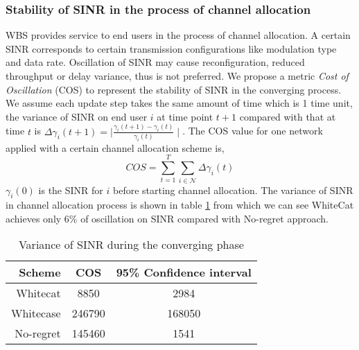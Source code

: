 \subsubsection*{Stability of SINR in the process of channel allocation}
WBS provides service to end users in the process of channel allocation. 
A certain SINR corresponds to certain transmission configurations like modulation type and data rate. Oscillation of SINR may cause reconfiguration, reduced throughput or delay variance, thus is not preferred. We propose a metric \textit{Cost of Oscillation} (COS) to represent the stability of SINR in the converging process. We assume each update step takes the same amount of time which is 1 time unit, the variance of SINR on end user $i$ at time point $t+1$ compared with that at time $t$ is $\varDelta  \gamma_i(t+1)=\mid\frac{\gamma_i(t+1)-\gamma_i(t)}{\gamma_i(t)} \mid$. The COS value for one network applied with a certain channel allocation scheme is,
\begin{equation}
\label{cos}
			COS = \sum\limits_{t=1}^T   \sum\limits_{i\in \mathcal{N}} \varDelta  \gamma_i(t)
			\end{equation}
$\gamma_i(0)$ is the SINR for $i$ before starting channel allocation. The variance of SINR in channel allocation process is shown in table \ref{costable} from which we can see WhiteCat achieves only 6\% of oscillation on SINR compared with No-regret approach.
\begin{table}[!h]
\centering
\begin{tabular}{|r|c|c|}
  \hline
  Scheme			 						& COS 					& 95\% Confidence interval\\
    \hline
  Whitecat									& 8850					& 2984\\
  Whitecase 								& 246790 				& 168050\\ %
  No-regret									& 145460				& 1541\\
  \hline
\end{tabular}
\caption{Variance of SINR during the converging phase}
\label{costable}
\end{table}



